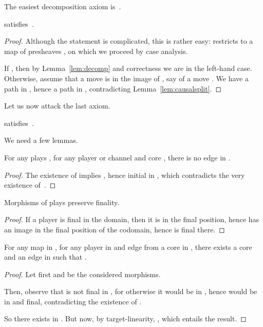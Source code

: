 \documentclass{LMCS}
\theoremstyle{plain}\newtheorem{satz}[thm]{Satz}
\begin{document}
The easiest decomposition axiom is~.
\begin{lem}\label{lem:decompsym}
   satisfies~.
\end{lem}

\begin{proof}
  Although the statement is complicated, this is rather easy: 
  restricts to a map of presheaves , on which we
  proceed by case analysis.

  If , then by Lemma~\ref{lem:decomp} and
  correctness we are in the left-hand case.  Otherwise, assume that a
  move  is in the image of , say of a move . We have a path  in , hence a path
   in , contradicting
  Lemma~\ref{lem:causalsplit}.
\end{proof}

Let us now attack the last axiom.
\begin{lem}\label{lem:decompleft}
 satisfies~.
\end{lem}

We need a few lemmas.


\begin{lem}\label{lem:causalcompo}
  For any plays , for any player or channel
   and core , there is no edge  in
  .
\end{lem}
\begin{proof}
  The existence of  implies , hence 
  initial in , which contradicts the very existence of~.
\end{proof}

\begin{lem}\label{lem:presfinal}
  Morphisms of plays preserve finality.
\end{lem}
\begin{proof}
  If a player is final in the domain, then it is in the final
  position, hence has an image in the final position of the codomain,
  hence is final there.
\end{proof}

\begin{lem}\label{lem:mapfib}
  For any map  in , for any player  in
   and edge  from a core in ,
  there exists a core  and an edge  in
   such that .
\end{lem}
\begin{proof}
  Let first  and  be the considered
  morphisms.

  Then, observe that  is not final in , for otherwise it would
  be in , hence  would be in  and final,
  contradicting the existence of .

  So there exists  in . But now, by
  target-linearity, , which entails the result.
\end{proof}
\end{document}
